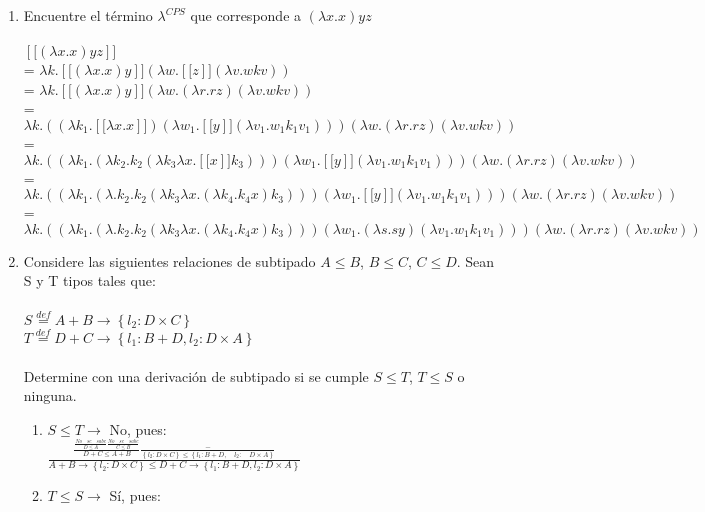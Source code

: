 \documentclass[a4paper]{article}
\begin{document}
\begin{enumerate}
\begin{enumerate}
\end{enumerate}
\item Encuentre el término $ {\lambda}^{CPS} $ que corresponde a $ (\lambda x.x)yz $
\\
\\
$ \left[[(\lambda x.x)yz \right]] $
\\ = $\lambda k.\left[[ (\lambda x.x)y \right]] (\lambda w.\left[[ z \right]] (\lambda v.wkv)) $
\\ \quad = $ \lambda k.\left[[(\lambda x.x)y \right]] (\lambda w.(\lambda r.rz)(\lambda v.wkv)) $
\\ \quad = $ \lambda k.(( \lambda k_1.\left[[ \lambda x.x \right]] )(\lambda w_1.\left[[y \right]]( \lambda v_1. w_1 k_1 v_1)))( \lambda w.(\lambda r.rz)(\lambda v.wkv)) $
\\ \quad = $ \lambda k.((\lambda k_1.(\lambda k_2.k_2(\lambda k_3\lambda x.\left[[ x \right]] k_3)))(\lambda w_1.\left[[ y \right]] ( \lambda v_1. w_1 k_1 v_1)))( \lambda w.(\lambda r.rz)(\lambda v.wkv))$
\\ \quad = $ \lambda k.((\lambda k_1.(\lambda.k_2.k_2(\lambda k_3\lambda x.(\lambda k_4.k_4x)k_3)))(\lambda w_1.\left[[y \right]]( \lambda v_1. w_1 k_1 v_1)))( \lambda w.(\lambda r.rz)(\lambda v.wkv)) $
\\ \quad = $ \lambda k.((\lambda k_1.(\lambda.k_2.k_2(\lambda k_3\lambda x.(\lambda k_4.k_4x)k_3)))(\lambda w_1.( \lambda s.sy )( \lambda v_1. w_1 k_1 v_1)))( \lambda w.(\lambda r.rz)(\lambda v.wkv)) $

\item Considere las siguientes relaciones de subtipado $ A\leq B $, $ B\leq C $, $C\leq D$. Sean S y T tipos tales que:
\\
\\ \hspace*{100 pt} $S \overset { def }{ = } A + B  \rightarrow \left\lbrace l_2 : D\times C\right\rbrace$
\\ \hspace*{100 pt} $T \overset { def }{ = } D + C  \rightarrow \left\lbrace l_1 : B+D, l_2: D\times A\right\rbrace$
\\
\\
Determine con una derivación de subtipado si se cumple $S\leq T$, $T\leq S$ o ninguna.
\begin{enumerate}
\item $ S\leq T \longrightarrow $ No, pues:
\\
$ \frac {
	\frac { 
		\frac { No \quad se \quad sabe }{ D\le A } 
		\frac { No\quad se\quad sabe }{ C\le B }  }{ D+C\le A+B } 
	\frac { - }{ \left\lbrace { l }_{ 2 }:D\times C\right\rbrace \le \left\lbrace { l }_{ 1 }:B+D,\quad { l }_{ 2 }:\quad D\times A\right\rbrace  }}{ A + B \rightarrow \left\lbrace l_2: D\times C\right\rbrace \leq D+C \rightarrow \left\lbrace l_1: B + D, l_2: D\times A \right\rbrace}
$
\\
\item $ T\leq S \longrightarrow $ Sí, pues:


\end{enumerate}
\end{enumerate}
\end{document}
